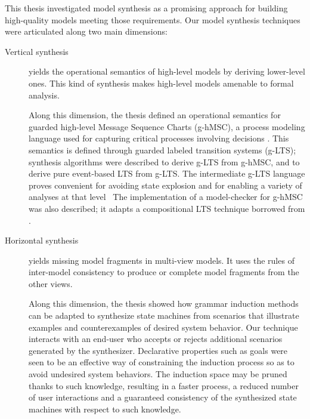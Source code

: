 This thesis investigated model synthesis as a promising approach for building high-quality models meeting those requirements. Our model synthesis techniques were articulated along two main dimensions:
\begin{description}
\item[Vertical synthesis] yields the operational semantics of high-level models by deriving lower-level ones. This kind of synthesis makes high-level models amenable to formal analysis.

Along this dimension, the thesis defined an operational semantics for guarded high-level Message Sequence Charts (g-hMSC), a process modeling language used for capturing critical processes involving decisions \cite{Damas:2011}. This semantics is defined through guarded labeled transition systems (g-LTS); synthesis algorithms were described to derive g-LTS from g-hMSC, and to derive pure event-based LTS from g-LTS. The intermediate g-LTS language proves convenient for avoiding state explosion and for enabling a variety of analyses at that level~\cite{Damas:2011} The implementation of a model-checker for g-hMSC was also described; it adapts a compositional LTS technique borrowed from \cite{Giannakopoulou:2003}.

\item[Horizontal synthesis] yields missing model fragments in multi-view models. It uses the rules of inter-model consistency to produce or complete model fragments from the other views.

Along this dimension, the thesis showed how grammar induction methods can be adapted to synthesize state machines from scenarios that illustrate examples and counterexamples of desired system behavior. Our technique interacts with an end-user who accepts or rejects additional scenarios generated by the synthesizer. Declarative properties such as goals were seen to be an effective way of constraining the induction process so as to avoid undesired system behaviors. The induction space may be pruned thanks to such knowledge, resulting in a faster process, a reduced number of user interactions and a guaranteed consistency of the synthesized state machines with respect to such knowledge.
\end{description}

